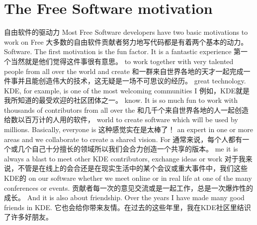 \section*{The Free Software motivation}
{自由软件的驱动力}
Most Free Software developers have two basic motivations to work on Free
大多数的自由软件贡献者努力地写代码都是有着两个基本的动力。
Software. The first motivation is the fun factor. It is a fantastic experience
第一个当然就是他们觉得这件事很有意思。
to work together with very talented people from all over the world and create
和一群来自世界各地的天才一起完成一件事并且能创造伟大的技术，这无疑是一场不可思议的经历。
great technology. KDE, for example, is one of the most welcoming communities I
例如，KDE就是我所知道的最受欢迎的社区团体之一。
know. It is so much fun to work with thousands of contributors from all over the
和几千个来自世界各地的人一起创造给数以百万计的人用的软件，
world to create software which will be used by millions. Basically, everyone is
这种感觉实在是太棒了！
an expert in one or more areas and we collaborate to create a shared vision. For
通常来说，每个人都有一个或几个自己十分擅长的领域所以我们会合力创造一个共享的版本。
me it is always a blast to meet other KDE contributors, exchange ideas or work
对于我来说，不管是在线上的会合还是在现实生活中的某个会议或重大事件中，我们这些KDE的
on our software whether we meet online or in real life at one of the many conferences or events. 
贡献者每一次的意见交流或是一起工作，总是一次爆炸性的成长。
And it is also about friendship. Over the years I have made many good friends in KDE.
它也会给你带来友情。在过去的这些年里，我在KDE社区里结识了许多好朋友。

